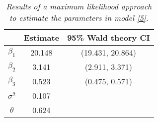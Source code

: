 \documentclass[12pt]{article}
\begin{document}
\begin{enumerate}
    \begin{table}[h]
      \caption{\emph{Results of a maximum likelihood approach to estimate the parameters in model \eqref{5}.}}
      \vspace{.2cm}
      \centering
      \begin{tabular}{|c|c|c|}
        \hline
        & Estimate & 95\% Wald theory CI \\
        \hline
        $\beta_1$ & 20.148 & (19.431, 20.864) \\
        \hline
        $\beta_2$ & 3.141 & (2.911, 3.371) \\
        \hline
        $\beta_3$ & 0.523 & (0.475, 0.571) \\
        \hline
        $\sigma^{2}$ & 0.107 & \\
        \hline
        $\theta$ & 0.624 & \\
        \hline
      \end{tabular}
      \label{tab6.1}
    \end{table}

\end{enumerate}
\end{document}
